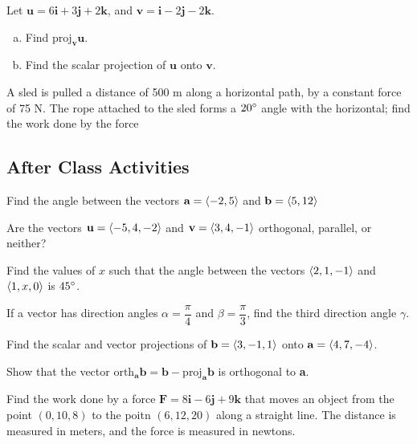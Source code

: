 \documentclass[notes]{subfiles}
\begin{document}
		\begin{ex}
			Let $\textbf{u} = 6\textbf{i} + 3\textbf{j} + 2\textbf{k}$, and $\textbf{v} = \textbf{i} - 2\textbf{j} -2\textbf{k}$.
			\begin{enumerate}[(a)]
				\item Find $\text{proj}_{\textbf{v}}\textbf{u}$.
					
				\item Find the scalar projection of $\textbf{u}$ onto $\textbf{v}$.
			\end{enumerate}
		\end{ex}
		
		\begin{ex}
			A sled is pulled a distance of 500 m along a horizontal path, by a constant force of 75 N.  The rope attached to the sled forms a $20^\circ$ angle with the horizontal; find the work done by the force
		\end{ex}
			\vs{1}
			\newpage
			
	\subsection*{After Class Activities}
		\begin{ex}
			Find the angle between the vectors $\textbf{a} = \left\langle -2,5\right\rangle$ and $\textbf{b} = \left\langle 5,12\right\rangle$
		\end{ex}
			
		\begin{ex}
			Are the vectors $\textbf{u} = \left\langle -5,4,-2\right\rangle$ and $\textbf{v} = \left\langle 3,4,-1\right\rangle$ orthogonal, parallel, or neither?
		\end{ex}
			\vs{1}
			
		\begin{ex}
			Find the values of $x$ such that the angle between the vectors $\left\langle 2,1,-1\right\rangle$ and $\left\langle 1,x,0\right\rangle$ is $45^\circ$.
		\end{ex}
			\vs{1}
			
		\begin{ex}
			If a vector has direction angles $\alpha = \dfrac{\pi}{4}$ and $\beta = \dfrac{\pi}{3}$, find the third direction angle $\gamma$.
		\end{ex}
			\vs{1}
			\newpage
			
		\begin{ex}
			Find the scalar and vector projections of $\textbf{b} = \left\langle 3,-1,1\right\rangle$ onto $\textbf{a} = \left\langle 4,7,-4\right\rangle$.
		\end{ex}
			
		\begin{ex}
			Show that the vector $\text{orth}_{\textbf{a}}\textbf{b} = \textbf{b} - \text{proj}_{\textbf{a}}\textbf{b}$ is orthogonal to \textbf{a}.  
		\end{ex}
			
		\begin{ex}
			Find the work done by a force $\textbf{F} = 8\textbf{i} - 6\textbf{j} + 9\textbf{k}$ that moves an object from the point $(0,10,8)$ to the poitn $(6,12,20)$ along a straight line.  The distance is measured in meters, and the force is measured in newtons.
		\end{ex}
\clearpage
\end{document}
